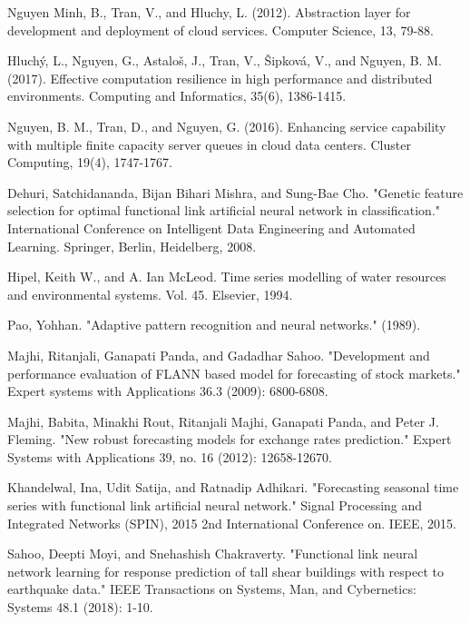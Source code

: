 \documentclass[conference]{IEEEtran}
\begin{document}
\begin{thebibliography}{00}

Nguyen Minh, B., Tran, V., and Hluchy, L. (2012). Abstraction layer for development and deployment of cloud services. Computer Science, 13, 79-88.

Hluchý, L., Nguyen, G., Astaloš, J., Tran, V., Šipková, V., and Nguyen, B. M. (2017). Effective computation resilience in high performance and distributed environments. Computing and Informatics, 35(6), 1386-1415.

Nguyen, B. M., Tran, D., and Nguyen, G. (2016). Enhancing service capability with multiple finite capacity server queues in cloud data centers. Cluster Computing, 19(4), 1747-1767.

Dehuri, Satchidananda, Bijan Bihari Mishra, and Sung-Bae Cho. "Genetic feature selection for optimal functional link artificial neural network in classification." International Conference on Intelligent Data Engineering and Automated Learning. Springer, Berlin, Heidelberg, 2008.

Hipel, Keith W., and A. Ian McLeod. Time series modelling of water resources and environmental systems. Vol. 45. Elsevier, 1994.

Pao, Yohhan. "Adaptive pattern recognition and neural networks." (1989).

Majhi, Ritanjali, Ganapati Panda, and Gadadhar Sahoo. "Development and performance evaluation of FLANN based model for forecasting of stock markets." Expert systems with Applications 36.3 (2009): 6800-6808.

Majhi, Babita, Minakhi Rout, Ritanjali Majhi, Ganapati Panda, and Peter J. Fleming. "New robust forecasting models for exchange rates prediction." Expert Systems with Applications 39, no. 16 (2012): 12658-12670.

Khandelwal, Ina, Udit Satija, and Ratnadip Adhikari. "Forecasting seasonal time series with functional link artificial neural network." Signal Processing and Integrated Networks (SPIN), 2015 2nd International Conference on. IEEE, 2015.

Sahoo, Deepti Moyi, and Snehashish Chakraverty. "Functional link neural network learning for response prediction of tall shear buildings with respect to earthquake data." IEEE Transactions on Systems, Man, and Cybernetics: Systems 48.1 (2018): 1-10.


\end{thebibliography}
\end{document}
